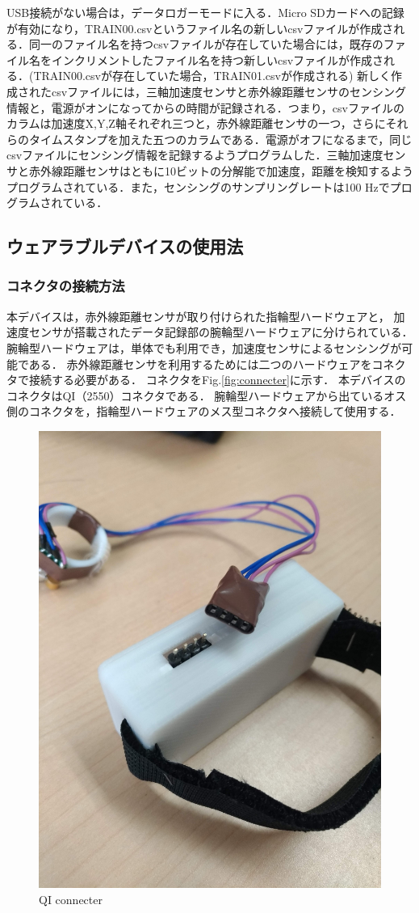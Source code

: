 USB接続がない場合は，データロガーモードに入る．Micro SDカードへの記録が有効になり，TRAIN00.csvというファイル名の新しいcsvファイルが作成される．同一のファイル名を持つcsvファイルが存在していた場合には，既存のファイル名をインクリメントしたファイル名を持つ新しいcsvファイルが作成される．(TRAIN00.csvが存在していた場合，TRAIN01.csvが作成される)
新しく作成されたcsvファイルには，三軸加速度センサと赤外線距離センサのセンシング情報と，電源がオンになってからの時間が記録される．つまり，csvファイルのカラムは加速度X,Y,Z軸それぞれ三つと，赤外線距離センサの一つ，さらにそれらのタイムスタンプを加えた五つのカラムである．電源がオフになるまで，同じcsvファイルにセンシング情報を記録するようプログラムした．三軸加速度センサと赤外線距離センサはともに10ビットの分解能で加速度，距離を検知するようプログラムされている．また，センシングのサンプリングレートは100 Hzでプログラムされている．

\subsection{ウェアラブルデバイスの使用法}
\subsubsection*{コネクタの接続方法}
本デバイスは，赤外線距離センサが取り付けられた指輪型ハードウェアと，
加速度センサが搭載されたデータ記録部の腕輪型ハードウェアに分けられている．
腕輪型ハードウェアは，単体でも利用でき，加速度センサによるセンシングが可能である．
赤外線距離センサを利用するためには二つのハードウェアをコネクタで接続する必要がある．
コネクタをFig.\ref{fig:connecter}に示す．
本デバイスのコネクタはQI（2550）コネクタである．
腕輪型ハードウェアから出ているオス側のコネクタを，指輪型ハードウェアのメス型コネクタへ接続して使用する．
\begin{figure}[H]
  \centering
  \includegraphics[width=0.5\linewidth]{fig/connecter.jpg}
  \caption{QI connecter}
  \label{fig:QI connecter}
\end{figure}


